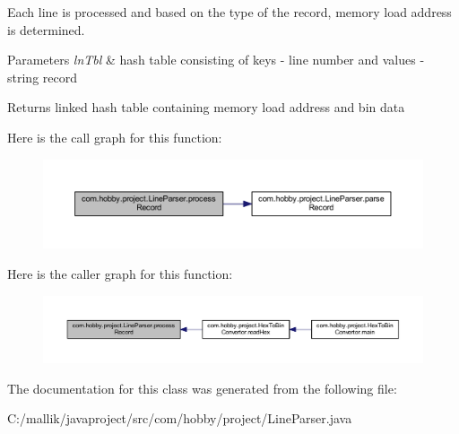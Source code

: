 Each line is processed and based on the type of the record, memory load address is determined.


\begin{DoxyParams}{Parameters}
{\em ln\+Tbl} & hash table consisting of keys -\/ line number and values -\/ string record \\
\hline
\end{DoxyParams}
\begin{DoxyReturn}{Returns}
linked hash table containing memory load address and bin data 
\end{DoxyReturn}
Here is the call graph for this function\+:
\nopagebreak
\begin{figure}[H]
\begin{center}
\leavevmode
\includegraphics[width=350pt]{classcom_1_1hobby_1_1project_1_1_line_parser_a6772015da2caff24e4d3c94589b1a5ff_cgraph}
\end{center}
\end{figure}
Here is the caller graph for this function\+:
\nopagebreak
\begin{figure}[H]
\begin{center}
\leavevmode
\includegraphics[width=350pt]{classcom_1_1hobby_1_1project_1_1_line_parser_a6772015da2caff24e4d3c94589b1a5ff_icgraph}
\end{center}
\end{figure}


The documentation for this class was generated from the following file\+:\begin{DoxyCompactItemize}
\item 
C\+:/mallik/javaproject/src/com/hobby/project/Line\+Parser.\+java\end{DoxyCompactItemize}

